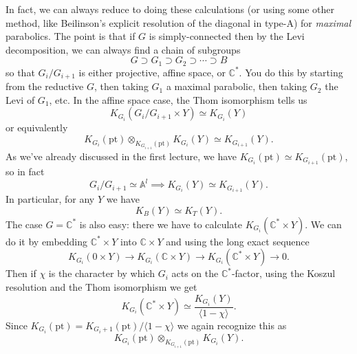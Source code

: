 \documentclass[11pt]{amsart}
\newtheorem{corollary}[dummy]{Corollary}
\theoremstyle{definition}
\newcommand{\bC}{\mathbb{C}}
\newcommand{\Fc}{\mathcal{F}}
\numberwithin{equation}{subsection}
\numberwithin{figure}{subsection}
\newcommand{\pt}{\mathrm{pt}}
\newcommand{\red}[1]{{\color{red}#1}}
\begin{document}
In fact, we can always reduce to doing these calculations (or using some other method, like Beilinson's explicit resolution of the diagonal in type-A) for \emph{maximal} parabolics. The point is that \red{if $G$ is simply-connected} then by the Levi decomposition, we can always find a chain of subgroups
$$
G\supset G_1\supset G_2\supset\cdots\supset B
$$
so that $G_i/G_{i+1}$ is either projective, affine space, or $\mathbb{C}^*$. You do this by starting from the reductive $G$, then taking $G_1$ a maximal parabolic, then taking $G_2$ the Levi of $G_1$, etc. In the affine space case, the Thom isomorphism tells us
$$
K_{G_i}(G_i/G_{i+1}\times Y) \simeq K_{G_i}(Y) 
$$ 
or equivalently
$$
K_{G_i}(\pt)\otimes_{K_{G_{i+1}}(\pt)}K_{G_i}(Y)\simeq K_{G_{i+1}}(Y).
$$
As we've already discussed in the first lecture, we have $K_{G_i}(\pt)\simeq K_{G_{i+1}}(\pt)$, so in fact 
$$
G_i/G_{i+1}\simeq \mathbb{A}^l \implies K_{G_i}(Y)\simeq K_{G_{i+1}}(Y).
$$
In particular, for any $Y$ we have
$$
K_B(Y)\simeq K_T(Y).
$$
The case $G=\bC^*$ is also easy: there we have to calculate $K_{G_i}(\bC^*\times Y)$.
We can do it by embedding $\bC^*\times Y$ into $\bC\times Y$ and using the long exact sequence
$$
K_{G_i}(0\times Y)\rightarrow K_{G_i}(\bC\times Y)\rightarrow K_{G_i}(\bC^*\times Y)\rightarrow 0.
$$
Then if $\chi$ is the character by which $G_i$ acts on the $\bC^*$-factor, using the Koszul resolution and the Thom isomorphism we get
$$
 K_{G_i}(\bC^*\times Y)\simeq \frac{K_{G_{i}}(Y)}{\langle 1-\chi\rangle}.
$$
Since $K_{G_i}(\pt)=K_{G_i+1}(\pt)/\langle 1-\chi\rangle$ we again recognize this as
$$
K_{G_i}(\pt)\otimes_{K_{G_{i+1}}(\pt)}K_{G_i}(Y).
$$
%
\end{document}
